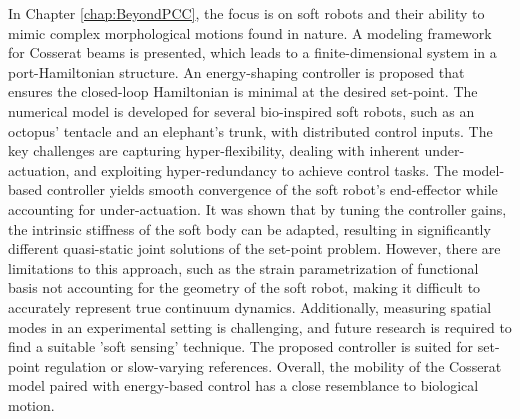 In Chapter \ref{chap:BeyondPCC}, the focus is on soft robots and their ability to mimic complex morphological motions found in nature. A modeling framework for Cosserat beams is presented, which leads to a finite-dimensional system in a port-Hamiltonian structure. An energy-shaping controller is proposed that ensures the closed-loop Hamiltonian is minimal at the desired set-point. The numerical model is developed for several bio-inspired soft robots, such as an octopus' tentacle and an elephant's trunk, with distributed control inputs. The key challenges are capturing hyper-flexibility, dealing with inherent under-actuation, and exploiting hyper-redundancy to achieve control tasks. The model-based controller yields smooth convergence of the soft robot's end-effector while accounting for under-actuation. It was shown that by tuning the controller gains, the intrinsic stiffness of the soft body can be adapted, resulting in significantly different quasi-static joint solutions of the set-point problem. However, there are limitations to this approach, such as the strain parametrization of functional basis not accounting for the geometry of the soft robot, making it difficult to accurately represent true continuum dynamics. Additionally, measuring spatial modes in an experimental setting is challenging, and future research is required to find a suitable 'soft sensing' technique. The proposed controller is suited for set-point regulation or slow-varying references. Overall, the mobility of the Cosserat model paired with energy-based control has a close resemblance to biological motion.

